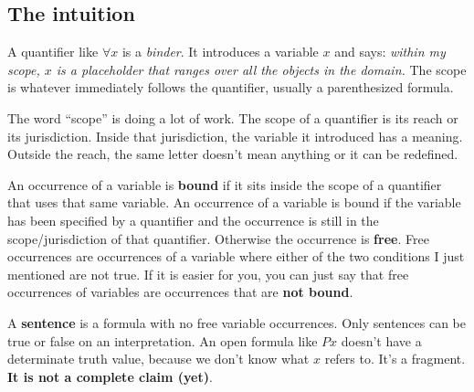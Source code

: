 \documentclass[11pt]{article}
\begin{document}
\subsection{The intuition}

A quantifier like $\forall x$ is a \emph{binder}. It introduces a variable $x$ and says: \emph{within my scope, $x$ is a placeholder that ranges over all the objects in the domain.} The scope is whatever immediately follows the quantifier, usually a parenthesized formula.

The word ``scope'' is doing a lot of work. The scope of a quantifier is its reach or its jurisdiction. Inside that jurisdiction, the variable it introduced has a meaning. Outside the reach, the same letter doesn't mean anything or it can be redefined.

An occurrence of a variable is \textbf{bound} if it sits inside the scope of a quantifier that uses that same variable. An occurrence of a variable is bound if the variable has been specified by a quantifier and the occurrence is still in the scope/jurisdiction of that quantifier. Otherwise the occurrence is \textbf{free}. Free occurrences are occurrences of a variable where either of the two conditions I just mentioned are not true. If it is easier for you, you can just say that free occurrences of variables are occurrences that are \textbf{not bound}.

A \textbf{sentence} is a formula with no free variable occurrences. Only sentences can be true or false on an interpretation. An open formula like $Px$ doesn't have a determinate truth value, because we don't know what $x$ refers to. It's a fragment. \textbf{It is not a complete claim (yet)}.
\end{document}
